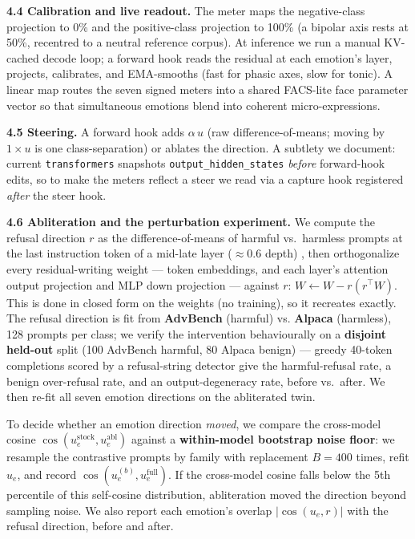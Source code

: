 \documentclass[
]{article}
\begin{document}
\textbf{4.4 Calibration and live readout.} The meter maps the
negative-class projection to 0\% and the positive-class projection to
100\% (a bipolar axis rests at 50\%, recentred to a neutral reference
corpus). At inference we run a manual KV-cached decode loop; a forward
hook reads the residual at each emotion's layer, projects, calibrates,
and EMA-smooths (fast for phasic axes, slow for tonic). A linear map
routes the seven signed meters into a shared FACS-lite face parameter
vector so that simultaneous emotions blend into coherent
micro-expressions.

\textbf{4.5 Steering.} A forward hook adds \(\alpha\,u\) (raw
difference-of-means; moving by \(1\times u\) is one class-separation) or
ablates the direction. A subtlety we document: current
\texttt{transformers} snapshots \texttt{output\_hidden\_states}
\emph{before} forward-hook edits, so to make the meters reflect a steer
we read via a capture hook registered \emph{after} the steer hook.

\textbf{4.6 Abliteration and the perturbation experiment.} We compute
the refusal direction \(r\) as the difference-of-means of harmful
vs.~harmless prompts at the last instruction token of a mid-late layer
(\(\approx 0.6\) depth) \citep{arditi2024refusal}, then orthogonalize
every residual-writing weight --- token embeddings, and each layer's
attention output projection and MLP down projection --- against \(r\):
\(W \leftarrow W - r(r^\top W)\). This is done in closed form on the
weights (no training), so it recreates exactly. The refusal direction is
fit from \textbf{AdvBench} (harmful) vs. \textbf{Alpaca} (harmless), 128
prompts per class; we verify the intervention behaviourally on a
\textbf{disjoint held-out} split (100 AdvBench harmful, 80 Alpaca
benign) --- greedy 40-token completions scored by a refusal-string
detector give the harmful-refusal rate, a benign over-refusal rate, and
an output-degeneracy rate, before vs.~after. We then re-fit all seven
emotion directions on the abliterated twin.

To decide whether an emotion direction \emph{moved}, we compare the
cross-model cosine \(\cos(u^{\text{stock}}_e, u^{\text{abl}}_e)\)
against a \textbf{within-model bootstrap noise floor}: we resample the
contrastive prompts by family with replacement \(B=400\) times, refit
\(u_e\), and record \(\cos(u_e^{(b)}, u_e^{\text{full}})\). If the
cross-model cosine falls below the 5th percentile of this self-cosine
distribution, abliteration moved the direction beyond sampling noise. We
also report each emotion's overlap \(|\cos(u_e, r)|\) with the refusal
direction, before and after.
\end{document}
